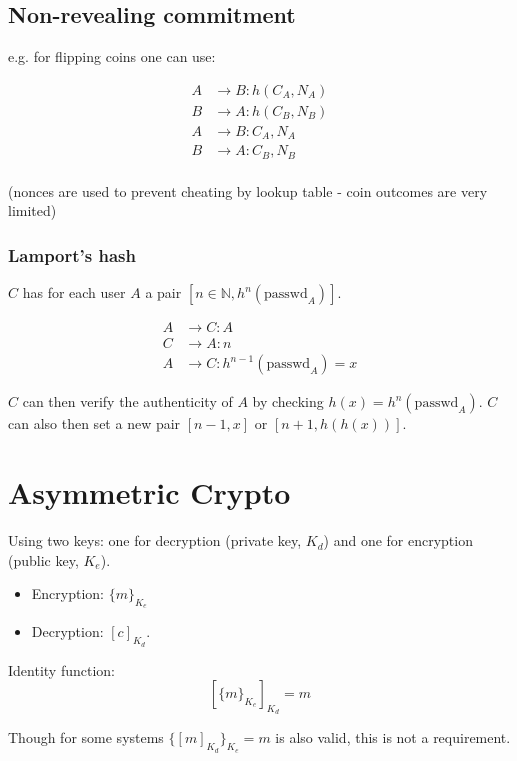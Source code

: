 \documentclass{article}
\begin{document}
\subsection{Non-revealing commitment}

e.g. for flipping coins one can use:

\begin{align*}
  A & \longrightarrow B : h(C_A, N_A) \\
  B & \longrightarrow A : h(C_B,N_B)  \\
  A & \longrightarrow B : C_A, N_A    \\
  B & \longrightarrow A : C_B, N_B    \\
\end{align*}

(nonces are used to prevent cheating by lookup table - coin outcomes are very
limited)

\subsubsection{Lamport's hash}

$C$ has for each user $A$ a pair $[n \in \mathbb{N}, h^n(\text{passwd}_A)]$.

\begin{align*}
  A & \rightarrow C : A \\
  C & \rightarrow A : n \\
  A &\rightarrow C  : h^{n-1}(\text{passwd}_A) = x
\end{align*}

$C$ can then verify the authenticity of $A$ by checking $h(x)
= h^n(\text{passwd}_A)$. $C$ can also then set a new pair $[n-1,x]$ or
$[n+1, h(h(x))]$.

\section{Asymmetric Crypto}

Using two keys: one for decryption (private key, $K_d$) and one for encryption
(public key, $K_e$).

\begin{itemize}
  \item Encryption: $\{m\}_{K_e} $
  \item Decryption: $[c]_{K_d}$.
\end{itemize}

Identity function: 
\[
  [\{m\}_{K_e}]_{K_d} = m
\]

Though for some systems $\{[m]_{K_d}\}_{K_e} =m$ is also valid, this is not
a requirement.
\end{document}
